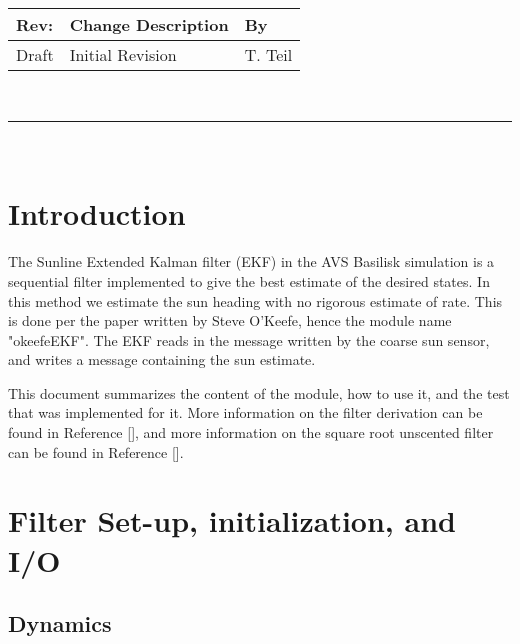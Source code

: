 \documentclass[]{BasiliskReportMemo}
\begin{document}
\makeCover



%
%
\pagestyle{empty}
{\renewcommand{\arraystretch}{2}
\noindent
\begin{longtable}{|p{0.5in}|p{4.5in}|p{1.14in}|}
\hline
{\bfseries Rev}: & {\bfseries Change Description} & {\bfseries By} \\
\hline
Draft & Initial Revision & T. Teil \\
\hline

\end{longtable}
}

\newpage
\setcounter{page}{1}
\pagestyle{fancy}

\tableofcontents
~\\ \hrule ~\\


\section{Introduction}
The Sunline Extended Kalman filter (EKF) in the AVS Basilisk simulation is a sequential
filter implemented to give the best estimate of the desired states.
In this method we estimate the sun heading with no rigorous estimate of rate. This is done per the paper written by Steve O'Keefe, hence the module name "okeefeEKF".
The EKF reads in the message written by the coarse sun sensor, and writes a message 
containing the sun estimate. 

This document summarizes the content of the module, how to use it, and the test that 
was implemented for it. More information on the filter derivation can be found in Reference [], and more information on the square root unscented filter can be found in Reference [].


\section{Filter Set-up, initialization, and I/O}

\subsection{Dynamics}
\end{document}
